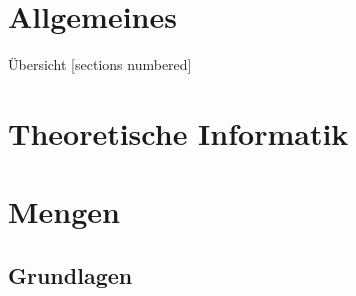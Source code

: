 %
%
%
%



\renewcommand\daynr{1}





\maketitle

\section{Allgemeines}



\begin{frame}[fragile]{Übersicht}
  [sections numbered]
  \tableofcontents%
\end{frame}

\section{Theoretische Informatik}



\section{Mengen}
\subsection{Grundlagen}

